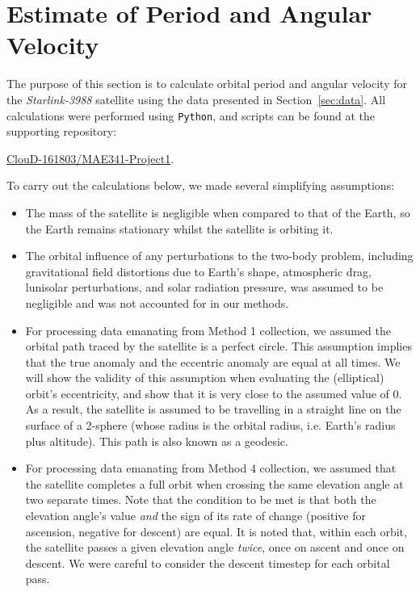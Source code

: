 \documentclass{article}
\begin{document}
\section{Estimate of Period and Angular Velocity} \label{first_estimates_and_assumptions}

The purpose of this section is to calculate orbital period and angular velocity for the \textit{Starlink-3988} satellite using the data presented in Section~\ref{sec:data}. All calculations were performed using \texttt{Python}, and scripts can be found at the supporting repository:
\begin{center}
    \href{https://github.com/ClouD-161803/MAE341-Project1}{ClouD-161803/MAE341-Project1}.
\end{center}

To carry out the calculations below, we made several simplifying assumptions:

\begin{itemize}
    \item The mass of the satellite is negligible when compared to that of the Earth, so the Earth remains stationary whilst the satellite is orbiting it.
    \item The orbital influence of any perturbations to the two-body problem, including gravitational field distortions due to Earth's shape, atmospheric drag, lunisolar perturbations, and solar radiation pressure, was assumed to be negligible and was not accounted for in our methods.
    \item For processing data emanating from Method 1 collection, we assumed the orbital path traced by the satellite is a perfect circle. This assumption implies that the true anomaly and the eccentric anomaly are equal at all times. We will show the validity of this assumption when evaluating the (elliptical) orbit's eccentricity, and show that it is very close to the assumed value of $0$. As a result, the satellite is assumed to be travelling in a straight line on the surface of a 2-sphere (whose radius is the orbital radius, i.e. Earth's radius plus altitude). This path is also known as a geodesic.
    \item For processing data emanating from Method 4 collection, we assumed that the satellite completes a full orbit when crossing the same elevation angle at two separate times. Note that the condition to be met is that both the elevation angle's value \emph{and} the sign of its rate of change (positive for ascension, negative for descent) are equal. It is noted that, within each orbit, the satellite passes a given elevation angle \emph{twice}, once on ascent and once on descent. We were careful to consider the descent timestep for each orbital pass. 
\end{itemize}
\end{document}
